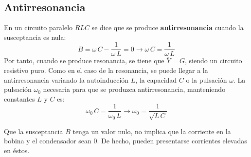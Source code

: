 	\subsection{Antirresonancia}
	En un circuito paralelo $RLC$ se dice que se produce \textbf{antirresonancia} cuando la susceptancia es nula:
	\begin{equation*}
		B=\omega\,C-\dfrac{1}{\omega\,L}=0\rightarrow \omega\,C=\dfrac{1}{\omega\,L}
	\end{equation*}
	Por tanto, cuando se produce resonancia, se tiene que $\overline{Y}=G$, siendo un circuito resistivo puro. Como en el caso de la resonancia, se puede llegar a la antirresonancia variando la autoinducción $L$, la capacidad $C$ o la pulsación $\omega$. La pulsación $\omega_0$ necesaria para que se produzca antirresonancia, manteniendo constantes $L$ y $C$ es:
	\begin{equation}
		\omega_0\,C=\dfrac{1}{\omega_0\,L}\rightarrow \boxed{\omega_0=\dfrac{1}{\sqrt{L\,C}}}
	\end{equation}
	\begin{remark}
		Que la susceptancia $B$ tenga un valor nulo, no implica que la corriente en la bobina y el condensador sean 0. De hecho, pueden presentarse corrientes elevadas en éstos.
	\end{remark}
	
